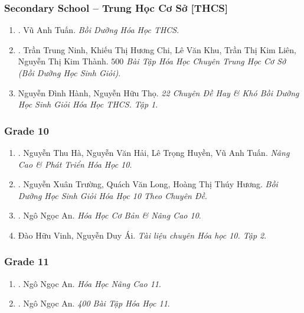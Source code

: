 \documentclass{article}
\begin{document}
\subsubsection{Secondary School -- Trung Học Cơ Sở [THCS]}

\begin{enumerate}
	\item \cite{Tuan2022}. Vũ Anh Tuấn. {\it Bồi Dưỡng Hóa Học THCS}.\hfill{\sf[reading]}
	\item \cite{Ninh_Chi_Khu_Lien_Thanh2019}. Trần Trung Ninh, Khiếu Thị Hương Chi, Lê Văn Khu, Trần Thị Kim Liên, Nguyễn Thị Kim Thành. {\it $500$ Bài Tập Hóa Học Chuyên Trung Học Cơ Sở (Bồi Dưỡng Học Sinh Giỏi)}.\hfill{\sf[reading]}
	\item Nguyễn Đình Hành, Nguyễn Hữu Thọ. {\it 22 Chuyên Đề Hay \& Khó Bồi Dưỡng Học Sinh Giỏi Hóa Học THCS. Tập 1}.
\end{enumerate}

\subsubsection{Grade 10}

\begin{enumerate}
	\item \cite{Ha_Hai_Huyen_Tuan2022}. Nguyễn Thu Hà, Nguyễn Văn Hải, Lê Trọng Huyền, Vũ Anh Tuấn. {\it Nâng Cao \& Phát Triển Hóa Học 10}.\hfill{\sf[reading]}
	\item \cite{Truong_Long_Huong_bdhsg_Hoa_Hoc_10}. Nguyễn Xuân Trường, Quách Văn Long, Hoàng Thị Thúy Hương. {\it Bồi Dưỡng Học Sinh Giỏi Hóa Học 10 Theo Chuyên Đề}.\hfill{\sf[reading]}
	\item \cite{An_Hoa_Hoc_co_ban_nang_cao_10}. Ngô Ngọc An. {\it Hóa Học Cơ Bản \& Nâng Cao 10}.\hfill{\sf[reading]}
	\item Đào Hữu Vinh, Nguyễn Duy Ái. {\it Tài liệu chuyên Hóa học 10. Tập 2}.\hfill{\sf[reading]}
\end{enumerate}

\subsubsection{Grade 11}

\begin{enumerate}
	\item \cite{An_Hoa_Hoc_nang_cao_11}. Ngô Ngọc An. {\it Hóa Học Nâng Cao 11}.\hfill{\sf[reading]}
	\item \cite{An_400_BT_Hoa_Hoc_11}. Ngô Ngọc An. {\it 400 Bài Tập Hóa Học 11}.\hfill{\sf[reading]}
\end{enumerate}
\end{document}

